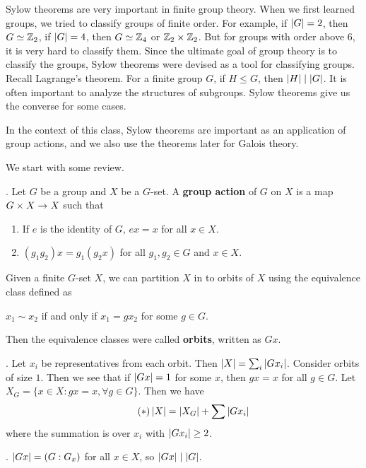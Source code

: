 
Sylow theorems are very important in finite group theory. When we first learned groups, we tried to classify groups of finite order. For example, if \(\left| G \right| = 2\), then \(G \simeq \mathbb{Z}_2\), if \(\left| G \right| = 4\), then \(G \simeq \mathbb{Z}_4\) or \(\mathbb{Z}_2 \times \mathbb{Z}_2\). But for groups with order above \(6\), it is very hard to classify them. Since the ultimate goal of group theory is to classify the groups, Sylow theorems were devised as a tool for classifying groups. Recall Lagrange's theorem. For a finite group \(G\), if \(H \leq G\), then \(\left| H \right| \mid \left| G \right|\). It is often important to analyze the structures of subgroups. Sylow theorems give us the converse for some cases.

In the context of this class, Sylow theorems are important as an application of group actions, and we also use the theorems later for Galois theory.

We start with some review.

.  Let \(G\) be a group and \(X\) be a \(G\)-set. A \textbf{group action} of \(G\) on \(X\) is a map \(G \times X \rightarrow X\) such that
\begin{enumerate}
    \item If \(e\) is the identity of \(G\), \(ex = x\) for all \(x \in X\).
    \item \((g_1g_2)x = g_1(g_2 x)\) for all \(g_1, g_2 \in G\) and \(x \in X\).
\end{enumerate}

\rmk Given a finite \(G\)-set \(X\), we can partition \(X\) in to orbits of \(X\) using the equivalence class defined as
\begin{center}
    \(x_1 \sim x_2\) if and only if \(x_1 = g x_2\) for some \(g \in G\).
\end{center}
Then the equivalence classes were called \textbf{orbits}, written as \(Gx\).

\prop.  Let \(x_i\) be representatives from each orbit. Then \(\left| X \right| = \sum_{i} \left| Gx_i \right|\). Consider orbits of size \(1\). Then we see that if \(\left| Gx \right| = 1\) for some \(x\), then \(gx = x\) for all \(g \in G\). Let \(X_G = \{x \in X : gx = x, \forall g \in G\}\). Then we have
\[ \tag{\mast}
    \abs{X} = \abs{X_G} + \sum \abs{G x_i}
\]
where the summation is over \(x_i\) with \(\left| G x_i \right| \geq 2\).

\prop. \(\left| Gx \right| = \left(G : G_x\right)\) for all \(x \in X\), so \(\left| Gx \right| \mid \left| G \right|\).

